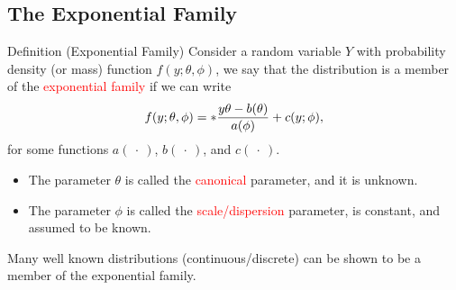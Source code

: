 \documentclass{article}\usepackage[]{graphicx}\usepackage[svgnames]{xcolor}
\let\exp\relax%
\begin{document}
\subsection*{The Exponential Family}
\begin{Regular}{Definition (Exponential Family)}
    Consider a random variable $ Y $ with probability density (or mass) function $ f(y;\theta,\phi) $,
    we say that the distribution is a member of the \textcolor{Red}{exponential family} if we can write
    \[ f(y;\theta,\phi)=\exp*{\frac{y\theta-b(\theta)}{a(\phi)}+c(y;\phi)}, \]
    for some functions $ a(\:\cdot\:) $, $ b(\:\cdot\:) $, and $ c(\:\cdot\:) $.
    \begin{itemize}
        \item The parameter $ \theta $ is called the \textcolor{Red}{canonical} parameter, and it is unknown.
        \item The parameter $ \phi $ is called the \textcolor{Red}{scale/dispersion} parameter, is constant, and assumed to be known.
    \end{itemize}
\end{Regular}
Many well known distributions (continuous/discrete) can be shown to be a
member of the exponential family.
\end{document}
